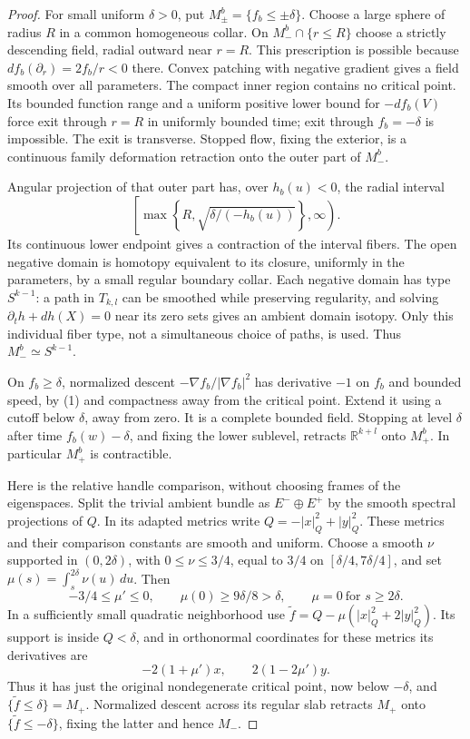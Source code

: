 \documentclass[11pt]{article}
\newcommand{\R}{\mathbb R}
\begin{document}
\begin{proof}
For small uniform \(\delta>0\), put \(M_\pm^b=\{f_b\leq\pm\delta\}\).
Choose a large sphere of radius \(R\) in a common homogeneous collar.
On \(M_-^b\cap\{r\leq R\}\) choose a strictly descending field,
radial outward near \(r=R\). This prescription is possible because
\(df_b(\partial_r)=2f_b/r<0\) there. Convex patching with negative
gradient gives a field smooth over all parameters. The compact inner
region contains no critical point. Its bounded function range and a
uniform positive lower bound for \(-df_b(V)\) force exit through
\(r=R\) in uniformly bounded time; exit through \(f_b=-\delta\) is
impossible. The exit is transverse.
Stopped flow, fixing the exterior, is a continuous family deformation
retraction onto the outer part of \(M_-^b\).

Angular projection of that outer part has, over \(h_b(u)<0\), the
radial interval
\[
 \left[\max\left\{R,\sqrt{\delta/(-h_b(u))}\right\},\infty\right).
 \tag{4}
\]
Its continuous lower endpoint gives a contraction of the interval
fibers. The open negative domain is homotopy equivalent to its
closure, uniformly in the parameters, by a small regular boundary
collar. Each negative domain has type \(S^{k-1}\): a path in
\(T_{k,l}\) can be smoothed while preserving regularity, and solving
\(\partial_t h+dh(X)=0\) near its zero sets gives an ambient domain
isotopy. Only this individual fiber type, not a simultaneous choice
of paths, is used. Thus \(M_-^b\simeq S^{k-1}\).

On \(f_b\geq\delta\), normalized descent
\(-\nabla f_b/|\nabla f_b|^2\) has derivative \(-1\) on \(f_b\)
and bounded speed, by (1) and compactness away from the critical
point. Extend it using a cutoff below \(\delta\), away from zero.
It is a complete bounded field. Stopping at level \(\delta\) after
time \(f_b(w)-\delta\), and fixing the lower sublevel, retracts
\(\R^{k+l}\) onto \(M_+^b\). In particular \(M_+^b\) is contractible.

Here is the relative handle comparison, without choosing frames of
the eigenspaces. Split the trivial ambient bundle as \(E^-\oplus E^+\)
by the smooth spectral projections of \(Q\).
In its adapted metrics write \(Q=-|x|_Q^2+|y|_Q^2\).
These metrics and their comparison constants are smooth and uniform.
Choose a smooth \(\nu\) supported in \((0,2\delta)\), with
\(0\leq\nu\leq3/4\), equal to \(3/4\) on
\([\delta/4,7\delta/4]\), and set
\(\mu(s)=\int_s^{2\delta}\nu(u)\,du\).
Then
\[
 -3/4\leq\mu'\leq0,\qquad
 \mu(0)\geq9\delta/8>\delta,\qquad
 \mu=0\ \text{for }s\geq2\delta.
 \tag{5}
\]
In a sufficiently small quadratic neighborhood use
\(\widetilde f=Q-\mu(|x|_Q^2+2|y|_Q^2)\).
Its support is inside \(Q<\delta\), and in orthonormal coordinates
for these metrics its derivatives are
\[
 -2(1+\mu')x,\qquad 2(1-2\mu')y.                 \tag{6}
\]
Thus it has just the original nondegenerate critical point, now
below \(-\delta\), and \(\{\widetilde f\leq\delta\}=M_+\).
Normalized descent across its regular slab retracts \(M_+\) onto
\(\{\widetilde f\leq-\delta\}\), fixing the latter and hence \(M_-\).


\end{proof}
\end{document}
